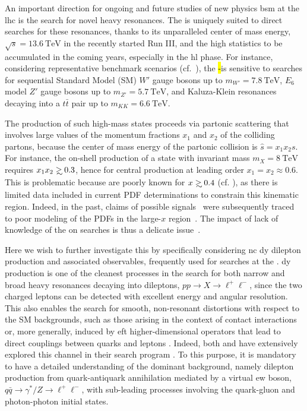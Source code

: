 
An important direction for ongoing and future studies of  new physics
\acrfull{bsm} at the \acrfull{lhc} is the search for novel heavy resonances.
%
The \lhc is uniquely suited to direct searches for these resonances, thanks to
its unparalleled center of mass energy,
$\sqrt{s}=\SI{13.6}{\tera\electronvolt}$ in the recently started  Run III, and
the high statistics to be accumulated in the coming years, especially in the
\acrfull{hl} phase.
%
For instance, considering representative benchmark \bsm scenarios (cf.\
\cite{CidVidal:2018eel}), the \hl-\lhc is sensitive to  searches for sequential
Standard Model (SM)  $W'$ gauge bosons  up to
$m_{W'}=\SI{7.8}{\tera\electronvolt}$, $E_6$ model $Z'$ gauge bosons up to
$m_{Z'}=\SI{5.7}{\tera\electronvolt}$, and Kaluza-Klein resonances decaying
into a $t\bar{t}$ pair up to $m_{KK}=\SI{6.6}{\tera\electronvolt}$.

The production of such high-mass states proceeds via partonic scattering that
involves large  values of the momentum fractions $x_1$ and $x_2$ of the
colliding partons, because the center of mass energy of the partonic collision
is $\hat s= x_1 x_2 s$.
%
For instance, the on-shell production of a state with invariant mass
$m_{X}=\SI{8}{\tera\electronvolt}$ requires $x_1x_2 \gsim 0.3$, hence for
central production at leading order $x_1=x_2\approx 0.6$. 
This is problematic because \pdfs are poorly known for $x\gsim 0.4$ (cf.
\cite{Gao:2017yyd,Kovarik:2019xvh}), as there is limited data included in
current PDF determinations to constrain this kinematic region.
%
Indeed, in the past, claims of possible \bsm signals~\cite{CDF:1996yow} 
were subsequently traced to poor modeling of the PDFs in the large-$x$
region~\cite{Lai:1996mg}.
%
The impact of lack of knowledge of the \pdfs
on \bsm searches is thus a delicate issue~\cite{Beenakker:2015rna}.

Here we wish to further investigate this by specifically considering
\acrfull{nc} \acrfull{dy} dilepton production and associated observables,
frequently  used for \bsm searches at the \lhc.
%
\nc \acrlong{dy} production is one of the cleanest processes in the search for 
both narrow and broad heavy resonances decaying into dileptons, $pp \to X \to
\ell^+\ell^-$, since  the two charged leptons can be detected with excellent
energy and angular resolution.
%
This also enables the search for smooth, non-resonant distortions with respect
to the SM backgrounds, such as those arising in the context of contact
interactions  or, more generally, induced by \acrfull{eft} higher-dimensional
operators that lead to  direct couplings between quarks and
leptons \cite{Ethier:2021bye,Dawson:2018dxp,Ellis:2020unq,Greljo:2021kvv}.
Indeed, both \atlas and \cms have extensively explored this channel in their
\bsm search program
\cite{ATLAS:2014gys,ATLAS:2020yat,ATLAS:2019erb,CMS:2021ctt,ATLAS:2021mla,CMS:2018nlk}.
To this purpose, it is mandatory to have a detailed understanding of the
dominant \sm background, namely dilepton production from quark-antiquark
annihilation mediated by a virtual \acrfull{ew} boson, $q\bar{q} \to 
\gamma^*/Z \to \ell^+\ell^-$, with sub-leading processes involving the
quark-gluon and photon-photon initial states.

